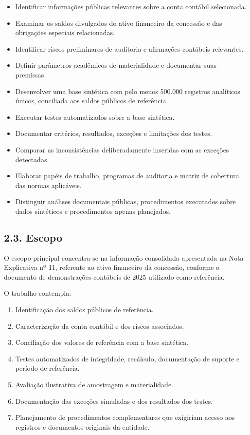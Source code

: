\documentclass[
]{article}
\providecommand{\tightlist}{%
  \setlength{\itemsep}{0pt}\setlength{\parskip}{0pt}}
\begin{document}
\begin{itemize}
\tightlist
\item
  Identificar informações públicas relevantes sobre a conta contábil
  selecionada.
\item
  Examinar os saldos divulgados do ativo financeiro da concessão e das
  obrigações especiais relacionadas.
\item
  Identificar riscos preliminares de auditoria e afirmações contábeis
  relevantes.
\item
  Definir parâmetros acadêmicos de materialidade e documentar suas
  premissas.
\item
  Desenvolver uma base sintética com pelo menos 500.000 registros
  analíticos únicos, conciliada aos saldos públicos de referência.
\item
  Executar testes automatizados sobre a base sintética.
\item
  Documentar critérios, resultados, exceções e limitações dos testes.
\item
  Comparar as inconsistências deliberadamente inseridas com as exceções
  detectadas.
\item
  Elaborar papéis de trabalho, programas de auditoria e matriz de
  cobertura das normas aplicáveis.
\item
  Distinguir análises documentais públicas, procedimentos executados
  sobre dados sintéticos e procedimentos apenas planejados.
\end{itemize}

\subsection{2.3. Escopo}\label{escopo}

O escopo principal concentra-se na informação consolidada apresentada na
Nota Explicativa nº 11, referente ao ativo financeiro da concessão,
conforme o documento de demonstrações contábeis de 2025 utilizado como
referência.

O trabalho contempla:

\begin{enumerate}
\def\labelenumi{\arabic{enumi}.}
\tightlist
\item
  Identificação dos saldos públicos de referência.
\item
  Caracterização da conta contábil e dos riscos associados.
\item
  Conciliação dos valores de referência com a base sintética.
\item
  Testes automatizados de integridade, recálculo, documentação de
  suporte e período de referência.
\item
  Avaliação ilustrativa de amostragem e materialidade.
\item
  Documentação das exceções simuladas e dos resultados dos testes.
\item
  Planejamento de procedimentos complementares que exigiriam acesso aos
  registros e documentos originais da entidade.
\end{enumerate}
\end{document}
